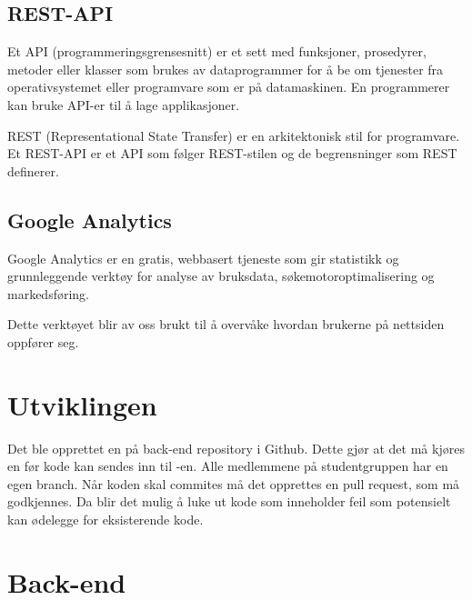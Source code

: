
\subsection{REST-API}
Et API (programmeringsgrensesnitt) er et sett med funksjoner, prosedyrer, metoder eller klasser som brukes av dataprogrammer for å be om tjenester fra operativsystemet eller programvare som er på datamaskinen. En programmerer kan bruke API-er til å lage applikasjoner.

REST (Representational State Transfer) er en arkitektonisk stil for programvare. Et REST-API \cite{Masse2011radr} er et API som følger REST-stilen og de begrensninger som REST definerer.

\subsection{Google Analytics}
\label{sec:google-analytics}
Google Analytics \cite{google2019gtk} er en gratis, webbasert tjeneste som gir statistikk og grunnleggende verktøy for analyse av bruksdata, søkemotoroptimalisering og markedsføring.

Dette verktøyet blir av oss brukt til å overvåke hvordan brukerne på nettsiden oppfører seg.

\section{Utviklingen}

Det ble opprettet en  på back-end repository i Github. Dette gjør at det må kjøres en  før kode kan sendes inn til -en. Alle medlemmene på studentgruppen har en egen branch.
Når koden skal commites må det opprettes en pull request, som må godkjennes. Da blir det mulig å luke ut kode som inneholder feil som potensielt kan ødelegge for eksisterende kode.

\section{Back-end}

